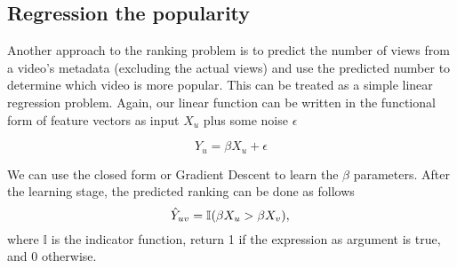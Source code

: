 \subsection{Regression the popularity}
\label{sec:regression}
	Another approach to the ranking problem is to predict the number of views from a video's metadata (excluding the actual views) and use the predicted number to determine which video is more popular. This can be treated as a simple linear regression problem. Again, our linear function can be written in the functional form of feature vectors as input $X_u$ plus some noise $\epsilon$
	
	\begin{equation}
	Y_u = \beta X_u + \epsilon
	\end{equation}
	 
	 We can use the closed form or Gradient Descent to learn the $\beta$ parameters. After the learning stage, the predicted ranking can be done as follows
	 \begin{equation}
	 	\hat{Y}_{uv} = \mathbb{I}(\beta X_u > \beta X_v),\\					
	 \end{equation}
	 where $\mathbb{I}$ is the indicator function, return 1 if the expression as argument is true, and 0 otherwise.
